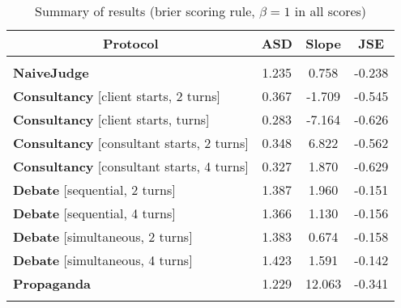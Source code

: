 \begin{table}[t]
\caption{Summary of results (brier scoring rule, $\beta=1$ in all scores)}
\label{tab:protocol-comparison}
\begin{center}
\begin{tabular}{lccc}
\multicolumn{1}{c}{\bf Protocol} & \multicolumn{1}{c}{\bf ASD} & \multicolumn{1}{c}{\bf Slope} & \multicolumn{1}{c}{\bf JSE} \\
\hline \\
\textbf{NaiveJudge} & 1.235 & 0.758 & -0.238 \\
\textbf{Consultancy} [client starts, 2 turns] & 0.367 & -1.709 & -0.545 \\
\textbf{Consultancy} [client starts, turns] & 0.283 & -7.164 & -0.626 \\
\textbf{Consultancy} [consultant starts, 2 turns] & 0.348 & 6.822 & -0.562 \\
\textbf{Consultancy} [consultant starts, 4 turns] & 0.327 & 1.870 & -0.629 \\
\textbf{Debate} [sequential, 2 turns] & 1.387 & 1.960 & -0.151 \\
\textbf{Debate} [sequential, 4 turns] & 1.366 & 1.130 & -0.156 \\
\textbf{Debate} [simultaneous, 2 turns] & 1.383 & 0.674 & -0.158 \\
\textbf{Debate} [simultaneous, 4 turns] & 1.423 & 1.591 & -0.142 \\
\textbf{Propaganda} & 1.229 & 12.063 & -0.341 \\
\\
\end{tabular}
\end{center}
\label{tab:results}
\end{table}